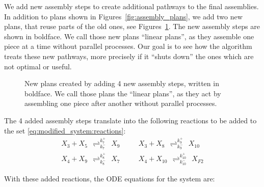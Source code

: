     We add new assembly steps to create additional pathways to the final assemblies. In addition to plans shown in Figures~\ref{fig:assembly_plans}, we add two new plans, that reuse parts of the old ones, see Figures~\ref{fig:assembly_plans_added}. The new assembly steps are shown in boldface. We call those new plans ``linear plans'', as they assemble one piece at a time without parallel processes. Our goal is to see how the algorithm treats these new pathways, more precisely if it ``shuts down'' the ones which are not optimal or useful.

    \begin{figure}[h!]
        \centering
        \; %
        \caption{New plans created by adding 4 new assembly steps, written in boldface. We call those plans the ``linear plans'', as they act by assembling one piece after another without parallel processes.}
    \label{fig:assembly_plans_added} %
    \end{figure}

    The 4 added assembly steps translate into the following reactions to be added to the set \eqref{eq:modified_system:reactions}:
    \begin{eqnarray}
        X_3 + X_5 ~~{\mathop{\rightleftharpoons}_{k_{7}^-}^{k_{7}^+}}~~ X_{9} & \quad & X_3 + X_8 ~~{\mathop{\rightleftharpoons}_{k_{9}^-}^{k_{9}^+}}~~ X_{10} \nonumber \\
        X_4 + X_{9} ~~{\mathop{\rightleftharpoons}_{k_{8}^-}^{k_{8}^+}}~~ X_7 & & X_4 + X_{10} ~~{\mathop{\rightleftharpoons}_{k_{10}^-}^{k_{10}^+}}~~ X_{F2}
    \label{eq:reactionsExp}
    \end{eqnarray}

    With these added reactions, the ODE equations for the system are:

